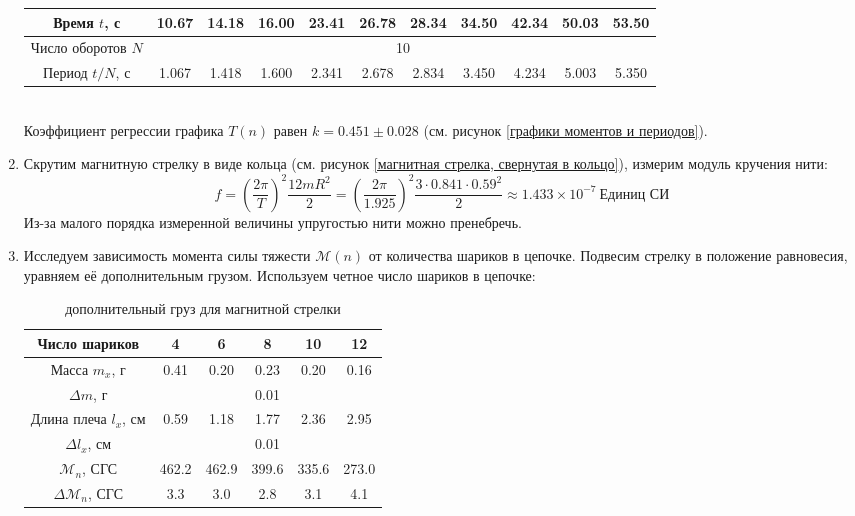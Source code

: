 \documentclass[a4paper, 12pt]{article}
\begin{document}
\begin{enumerate}
\begin{table}[htbp]
\begin{tabular}{|c|c|c|c|c|c|c|c|c|c|c|}
            Время $t$, с & 10.67 & 14.18 & 16.00 & 23.41 & 26.78 & 28.34 & 34.50 & 42.34 & 50.03 & 53.50\\ \hline
            Число оборотов $N$ & \multicolumn{10}{|c|}{10}\\ \hline
            Период $t/N$, с & 1.067 & 1.418 & 1.600 & 2.341 & 2.678 & 2.834 & 3.450 & 4.234 & 5.003 & 5.350\\ \hline
        \end{tabular}
    \end{table}\\
    Коэффициент регрессии графика $T(n)$ равен $k = 0.451\pm 0.028$ (см. рисунок \ref{графики моментов и периодов}).
    \item Скрутим магнитную стрелку в виде кольца (см. рисунок \ref{магнитная стрелка, свернутая в кольцо}), измерим модуль кручения нити:
    \begin{equation*}
        f = \left(\frac{2\pi}{T}\right)^{2}\frac{12mR^{2}}{2} = \left(\frac{2\pi}{1.925}\right)^{2}\frac{3\cdot0.841\cdot 0.59^{2}}{2} \approx 1.433\times 10^{-7}\ \text{Единиц СИ}
    \end{equation*}
    Из-за малого порядка измеренной величины упругостью нити можно пренебречь.
    \item Исследуем зависимость момента силы тяжести $\mathcal{M}(n)$ от количества шариков в цепочке. Подвесим стрелку в положение равновесия, уравняем её дополнительным грузом. Используем четное число шариков в цепочке:
    \begin{table}[htbp]
        \centering
        \begin{tabular}{|c|c|c|c|c|c|}
            \hline
            Число шариков & 4 & 6 & 8 & 10 & 12\\ \hline
            Масса $m_{x}$, г & 0.41 & 0.20 & 0.23 & 0.20 & 0.16\\ \hline
            $\Delta m$, г & \multicolumn{5}{|c|}{0.01}\\ \hline
            Длина плеча $l_{x}$, см & 0.59 & 1.18 & 1.77 & 2.36 & 2.95\\ \hline
            $\Delta l_{x}$, см & \multicolumn{5}{|c|}{0.01}\\ \hline
            $\mathcal{M}_{n}$, СГС & 462.2 & 462.9 & 399.6 & 335.6 & 273.0\\ \hline
            $\Delta \mathcal{M}_{n}$, СГС & 3.3 & 3.0 & 2.8 & 3.1 & 4.1\\ \hline
        \end{tabular}
        \caption{дополнительный груз для магнитной стрелки}

\end{table}
\end{enumerate}
\end{document}
